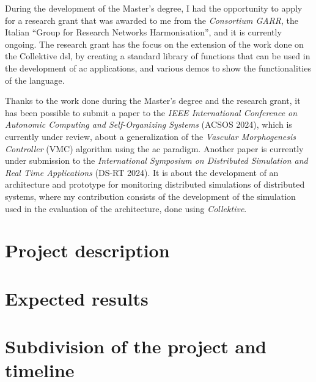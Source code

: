 \documentclass[12pt, a4paper]{article}
\begin{document}
During the development of the Master's degree,
I had the opportunity to apply for a research grant that was awarded to me from the \emph{Consortium GARR},
the Italian ``Group for Research Networks Harmonisation'',
and it is currently ongoing.
%
The research grant has the focus on the extension of the work done on the Collektive \ac{dsl},
by creating a standard library of functions that can be used in the development of \ac{ac} applications,
and various demos to show the functionalities of the language.

Thanks to the work done during the Master's degree and the research grant,
it has been possible to submit a paper to the \emph{IEEE International Conference on Autonomic Computing and Self-Organizing Systems} (ACSOS 2024),
which is currently under review,
about a generalization of the \emph{Vascular Morphogenesis Controller} (VMC) algorithm using the \ac{ac} paradigm.
%
Another paper is currently under submission to the \emph{International Symposium on Distributed Simulation and Real Time Applications} (DS-RT 2024).
%
It is about the development of an architecture and prototype for monitoring distributed simulations of distributed systems,
where my contribution consists of the development of the simulation used in the evaluation of the architecture,
done using \emph{Collektive}.


\section{Project description}\label{sec:project-description}

\section{Expected results}\label{sec:expected-results}

\section{Subdivision of the project and timeline}\label{sec:subdivision-of-the-project-and-timeline}
\end{document}
